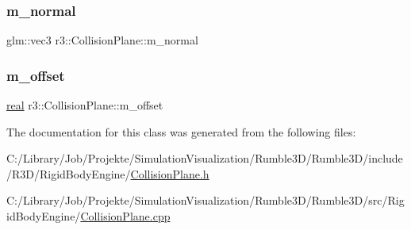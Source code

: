 \mbox{\label{classr3_1_1_collision_plane_ab65e832434d2da433e79c93ac12f4b43}} 
\subsubsection{\texorpdfstring{m\+\_\+normal}{m\_normal}}
{\footnotesize\ttfamily glm\+::vec3 r3\+::\+Collision\+Plane\+::m\+\_\+normal\hspace{0.3cm}{\ttfamily [protected]}}

\mbox{\label{classr3_1_1_collision_plane_a8ae3c28197b05088e405ff9944632f74}} 
\subsubsection{\texorpdfstring{m\+\_\+offset}{m\_offset}}
{\footnotesize\ttfamily \mbox{\hyperlink{namespacer3_ab2016b3e3f743fb735afce242f0dc1eb}{real}} r3\+::\+Collision\+Plane\+::m\+\_\+offset\hspace{0.3cm}{\ttfamily [protected]}}



The documentation for this class was generated from the following files\+:\begin{DoxyCompactItemize}
\item 
C\+:/\+Library/\+Job/\+Projekte/\+Simulation\+Visualization/\+Rumble3\+D/\+Rumble3\+D/include/\+R3\+D/\+Rigid\+Body\+Engine/\mbox{\hyperlink{_collision_plane_8h}{Collision\+Plane.\+h}}\item 
C\+:/\+Library/\+Job/\+Projekte/\+Simulation\+Visualization/\+Rumble3\+D/\+Rumble3\+D/src/\+Rigid\+Body\+Engine/\mbox{\hyperlink{_collision_plane_8cpp}{Collision\+Plane.\+cpp}}\end{DoxyCompactItemize}
